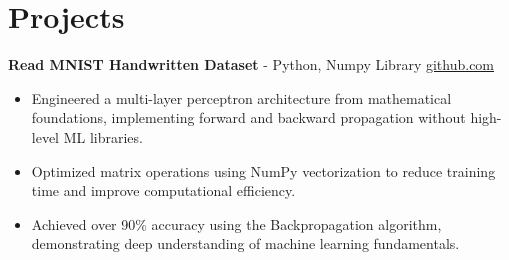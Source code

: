 \documentclass[11pt]{article}       %
\begin{document}
\vspace{-18.5pt}

\section*{Projects}

\textbf{Read MNIST Handwritten Dataset}{ - Python, Numpy Library} \hfill \href{https://github.com/Monica20030707/Artificial-Neutral-Network_ML}{github.com} \\
\vspace{-9pt}
\begin{itemize} 
  \item Engineered a multi-layer perceptron architecture from mathematical foundations, implementing forward and backward propagation without high-level ML libraries.
  \item Optimized matrix operations using NumPy vectorization to reduce training time and improve computational efficiency.
  \item Achieved over 90\% accuracy using the Backpropagation algorithm, demonstrating deep understanding of machine learning fundamentals.
\end{itemize}

\end{document}
